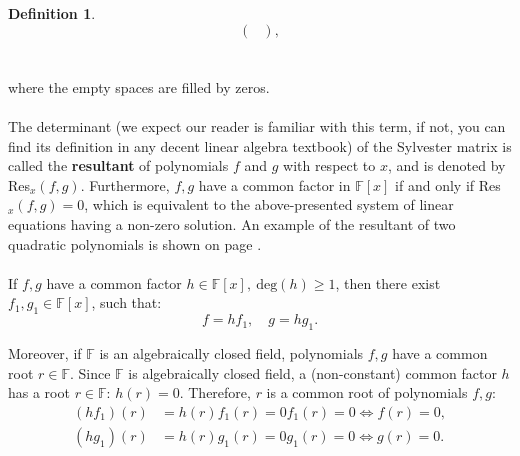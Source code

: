 \documentclass[thesis=M,english]{FITthesis}[2012/10/20]
\theoremstyle{remark}
\theoremstyle{definition}
\newtheorem{DF}{Definition}[section]
\begin{document}
\begin{DF}
$$\begin{pmatrix}
\end{pmatrix},
$$ \\  \\
\noindent where the empty spaces are filled by zeros. \\ \\
\noindent The determinant (we expect our reader is familiar with this term, if not, you can find its definition in any decent linear algebra textbook) of the Sylvester matrix is called the \textbf{resultant} of polynomials $f$ and $g$ with respect to $x$, and is denoted by Res$_{x}(f,g)$. Furthermore, $f,g$ have a common factor in $\mathbb{F}[x]$ if and only if Res$_x(f,g) = 0$, which is equivalent to the above-presented system of linear equations having a non-zero solution. An example of the resultant of two quadratic polynomials is shown on page \pageref{resExample}. 
\\ \\
\noindent If $f,g$ have a common factor $h \in \mathbb{F}[x],\ \text{deg}(h) \geq 1$, then there exist ${f_1, g_1 \in \mathbb{F}[x]}$, such that:
$$
f = hf_1, \quad g = hg_1.
$$
\end{DF}
\noindent Moreover, if $\mathbb{F}$ is an algebraically closed field, polynomials $f,g$ have a common root $r \in \mathbb{F}$. Since $\mathbb{F}$ is algebraically closed field, a (non-constant) common factor $h$ has a root ${r \in \mathbb{F}}$: ${h(r) = 0}$. Therefore, $r$ is a common root of polynomials $f,g$:
\begin{align*}
(hf_1)(r) &= h(r)f_1(r) = 0f_1(r) = 0 \Leftrightarrow f(r) = 0 ,\\
(hg_1)(r) &= h(r)g_1(r) = 0g_1(r) = 0 \Leftrightarrow g(r) = 0.\\
\end{align*}
\end{document}

